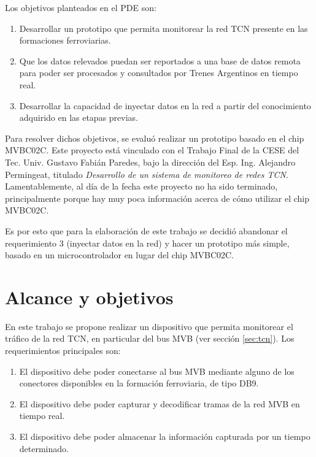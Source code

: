 Los objetivos planteados en el PDE son:

\begin{enumerate}
\item Desarrollar un prototipo que permita monitorear la red TCN presente en las formaciones ferroviarias.
\item Que los datos relevados puedan ser reportados a una base de datos remota para poder ser procesados y consultados por Trenes Argentinos en tiempo real.
\item Desarrollar la capacidad de inyectar datos en la red a partir del conocimiento adquirido en las etapas previas.
\end{enumerate}

Para resolver dichos objetivos, se evaluó realizar un prototipo basado en el chip MVBC02C. Este proyecto está vinculado con el Trabajo Final de la CESE del Tec. Univ. Gustavo Fabián Paredes, bajo la dirección del Esp. Ing. Alejandro Permingeat, titulado \textit{Desarrollo de un sistema de monitoreo de redes TCN}. Lamentablemente, al día de la fecha este proyecto no ha sido terminado, principalmente porque hay muy poca información acerca de cómo utilizar el chip MVBC02C.

Es por esto que para la elaboración de este trabajo se decidió abandonar el requerimiento 3 (inyectar datos en la red) y hacer un prototipo más simple, basado en un microcontrolador en lugar del chip MVBC02C.

\section{Alcance y objetivos}

En este trabajo se propone realizar un dispositivo que permita monitorear el tráfico de la red TCN, en particular del bus MVB (ver sección \ref{sec:tcn}). Los requerimientos principales son:

\begin{enumerate}
\item El dispositivo debe poder conectarse al bus MVB mediante alguno de los conectores disponibles en la formación ferroviaria, de tipo DB9.
\item El dispositivo debe poder capturar y decodificar tramas de la red MVB en tiempo real.
\item El dispositivo debe poder almacenar la información capturada por un tiempo determinado.
\end{enumerate}
